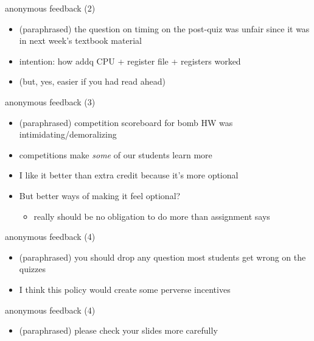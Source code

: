 \begin{frame}{anonymous feedback (2)}
\begin{itemize}
    \item (paraphrased) the question on timing on the post-quiz was unfair since it was in next week's textbook material
        \vspace{.5cm}
    \item intention: how addq CPU + register file + registers worked
    \item (but, yes, easier if you had read ahead)
\end{itemize}
\end{frame}

\begin{frame}{anonymous feedback (3)}
\begin{itemize}
\item (paraphrased) competition scoreboard for bomb HW was intimidating/demoralizing
\vspace{.5cm}
\item competitions make \textit{some} of our students learn more
\item I like it better than extra credit because it's more optional
\vspace{.5cm}
\item But better ways of making it feel optional?
    \begin{itemize}
    \item really should be no obligation to do more than assignment says
    \end{itemize}
\end{itemize}
\end{frame}

\begin{frame}{anonymous feedback (4)}
\begin{itemize}
\item (paraphrased) you should drop any question most students get wrong on the quizzes
    \vspace{.5cm}
\item I think this policy would create some perverse incentives
\end{itemize}
\end{frame}

\begin{frame}{anonymous feedback (4)}
\begin{itemize}
\item (paraphrased) please check your slides more carefully
\end{itemize}
\end{frame}

